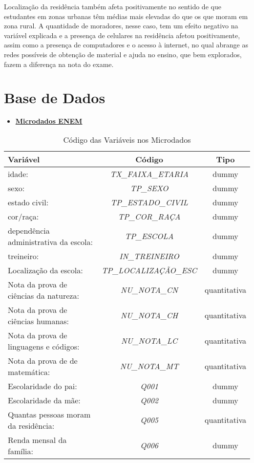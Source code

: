 \documentclass[tcc1,project]{uftex}
\begin{document}
Localização da residência também afeta positivamente no sentido de que estudantes em zonas urbanas têm médias mais elevadas do que os que moram em zona rural. A quantidade de moradores, nesse caso, tem um efeito negativo na variável explicada e a presença de celulares na residência afetou positivamente, assim como a presença de computadores e o acesso à internet, no qual abrange as redes possíveis de obtenção de material e ajuda no ensino, que bem explorados, fazem a diferença na nota do exame. \\  

\section*{Base de Dados}

\begin{itemize}

\item \textbf{\href{https://www.gov.br/inep/pt-br/acesso-a-informacao/dados-abertos/microdados/enem}{Microdados ENEM}}

\end{itemize}

\begin{table}[h]
\centering
\caption{Código das Variáveis nos Microdados}
\begin{tabular}{lcc}
\hline\hline
\textbf{Variável} & \textbf{Código} & \textbf{Tipo} \\
\hline\hline
idade: & \textit{TX\_FAIXA\_ETARIA} & dummy \\
sexo: & \textit{TP\_SEXO} & dummy \\
estado civil: & \textit{TP\_ESTADO\_CIVIL} & dummy \\
cor/raça: & \textit{TP\_COR\_RAÇA} & dummy \\
dependência administrativa da escola: & \textit{TP\_ESCOLA} & dummy \\
treineiro: & \textit{IN\_TREINEIRO} & dummy \\
Localização da escola: & \textit{TP\_LOCALIZAÇÃO\_ESC} & dummy \\
Nota da prova de ciências da natureza: & \textit{NU\_NOTA\_CN} & quantitativa \\
Nota da prova de ciências humanas: & \textit{NU\_NOTA\_CH} & quantitativa \\
Nota da prova de linguagens e códigos: & \textit{NU\_NOTA\_LC} & quantitativa \\
Nota da prova de de matemática: & \textit{NU\_NOTA\_MT} & quantitativa \\
Escolaridade do pai: & \textit{Q001} & dummy \\
Escolaridade da mãe: & \textit{Q002} & dummy \\
Quantas pessoas moram da residência: & \textit{Q005} & quantitativa \\
Renda mensal da família: & \textit{Q006} & dummy \\
\hline
\end{tabular}
\label{Observação: Todas estão condicionadas à variável da UF do Tocantins SG\_UF\_ESC}
\end{table}
\end{document}
